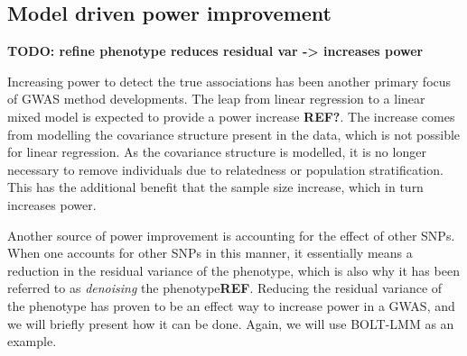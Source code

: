 %

\subsection{Model driven power improvement}
\textbf{TODO: refine phenotype reduces residual var -> increases power}

Increasing power to detect the true associations has been another primary focus of GWAS method developments. The leap from linear regression to a linear mixed model is expected to provide a power increase \textbf{REF?}. The increase comes from modelling the covariance structure present in the data, which is not possible for linear regression. As the covariance structure is modelled, it is no longer necessary to remove individuals due to relatedness or population stratification. This has the additional benefit that the sample size increase, which in turn increases power. 

Another source of power improvement is accounting for the effect of other SNPs. When one accounts for other SNPs in this manner, it essentially means a reduction in the residual variance of the phenotype, which is also why it has been referred to as \textit{denoising} the phenotype\textbf{REF}. Reducing the residual variance of the phenotype has proven to be an effect way to increase power in a GWAS, and we will briefly present how it can be done. Again, we will use BOLT-LMM as an example.

